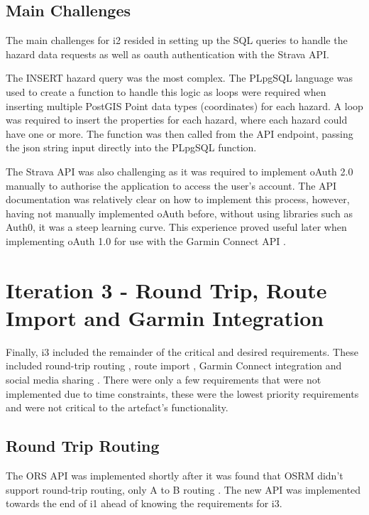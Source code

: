 \subsection{Main Challenges}
\label{iteration2:main-challenges}

The main challenges for i2 resided in setting up the SQL queries to handle the hazard data requests as well as oauth authentication with the Strava API.

The INSERT hazard query was the most complex. The PLpgSQL language was used to create a function to handle this logic as loops were required when inserting multiple PostGIS Point data types (coordinates) for each hazard. A loop was required to insert the properties for each hazard, where each hazard could have one or more. The function was then called from the API endpoint, passing the json string input directly into the PLpgSQL function.

The Strava API was also challenging as it was required to implement oAuth 2.0 manually to authorise the application to access the user's account. The API documentation was relatively clear on how to implement this process, however, having not manually implemented oAuth before, without using libraries such as Auth0, it was a steep learning curve. This experience proved useful later when implementing oAuth 1.0 for use with the Garmin Connect API .

\clearpage
\section{Iteration 3 - Round Trip, Route Import and Garmin Integration}
\label{implementation:iteration3}

Finally, i3 included the remainder of the critical and desired requirements. These included round-trip routing , route import , Garmin Connect integration  and social media sharing . There were only a few requirements that were not implemented due to time constraints, these were the lowest priority requirements and were not critical to the artefact's functionality.

\subsection{Round Trip Routing}
\label{iteration3:round-trip}

The ORS API was implemented shortly after it was found that OSRM didn't support round-trip routing, only A to B routing . The new API was implemented towards the end of i1  ahead of knowing the requirements for i3. 

